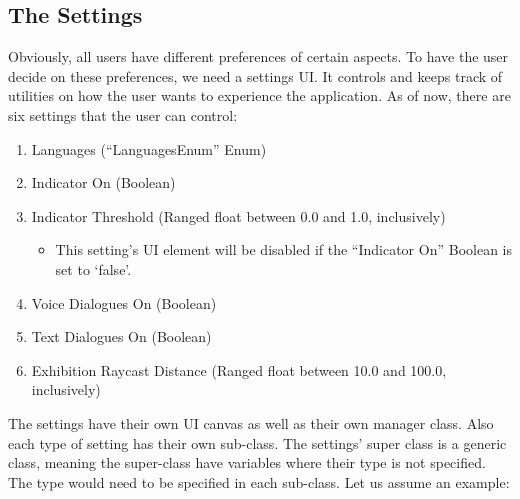 \subsection{The Settings}
\label{SettingsSec}
Obviously, all users have different preferences of certain aspects. To have the user decide on these preferences, we need a settings \acrshort{UI}. It controls and keeps track of utilities on how the user wants to experience the application. As of now, there are six settings that the user can control:
\begin{enumerate}
\item{Languages (“{\codefont LanguagesEnum}” \acrshort{Enum})}
\item{Indicator On (Boolean)}
\item{Indicator Threshold (Ranged float between 0.0 and 1.0, inclusively)}
\begin{itemize}
\item{This setting's \acrshort{UI} element will be disabled if the “Indicator On” Boolean is set to ‘{\codefont false}’.}
\end{itemize}
\item{Voice Dialogues On (Boolean)}
\item{Text Dialogues On (Boolean)}
\item{Exhibition Raycast Distance (Ranged float between 10.0 and 100.0, inclusively)}
\end{enumerate}
The settings have their own UI canvas as well as their own manager class. Also each type of setting has their own sub-class. The settings' super class is a generic class, meaning the super-class have variables where their type is not specified. The type would need to be specified in each sub-class. Let us assume an example:\\
